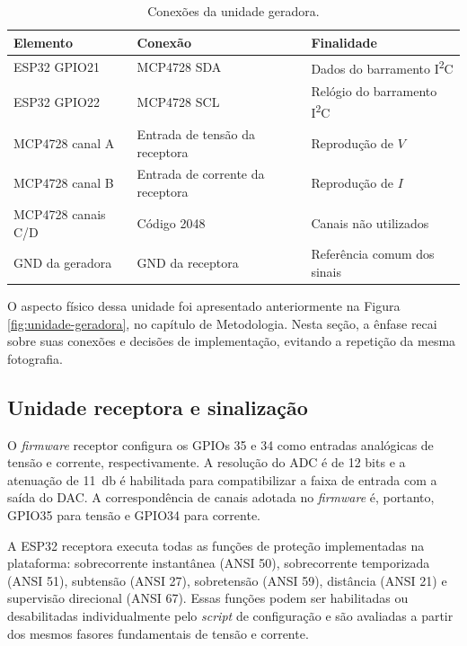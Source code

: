 \begin{table}[H]
  \centering
  \small
  \caption{Conexões da unidade geradora.}
  \label{tab:pinagem-geradora}
  \begin{tabular}{lll}
    \toprule
    Elemento & Conexão & Finalidade \\
    \midrule
    ESP32 GPIO21 & MCP4728 SDA & Dados do barramento I\textsuperscript{2}C \\
    ESP32 GPIO22 & MCP4728 SCL & Relógio do barramento I\textsuperscript{2}C \\
    MCP4728 canal A & Entrada de tensão da receptora & Reprodução de $V$ \\
    MCP4728 canal B & Entrada de corrente da receptora & Reprodução de $I$ \\
    MCP4728 canais C/D & Código 2048 & Canais não utilizados \\
    GND da geradora & GND da receptora & Referência comum dos sinais \\
    \bottomrule
  \end{tabular}
\end{table}

O aspecto físico dessa unidade foi apresentado anteriormente na Figura \ref{fig:unidade-geradora}, no capítulo de Metodologia. Nesta seção, a ênfase recai sobre suas conexões e decisões de implementação, evitando a repetição da mesma fotografia.

\subsection{Unidade receptora e sinalização}

O \textit{firmware} receptor configura os GPIOs 35 e 34 como entradas analógicas de tensão e corrente, respectivamente. A resolução do ADC é de 12 bits e a atenuação de \SI{11}{\decibel} é habilitada para compatibilizar a faixa de entrada com a saída do DAC. A correspondência de canais adotada no \textit{firmware} é, portanto, GPIO35 para tensão e GPIO34 para corrente.

A ESP32 receptora executa todas as funções de proteção implementadas na plataforma: sobrecorrente instantânea (ANSI 50), sobrecorrente temporizada (ANSI 51), subtensão (ANSI 27), sobretensão (ANSI 59), distância (ANSI 21) e supervisão direcional (ANSI 67). Essas funções podem ser habilitadas ou desabilitadas individualmente pelo \textit{script} de configuração e são avaliadas a partir dos mesmos fasores fundamentais de tensão e corrente.

